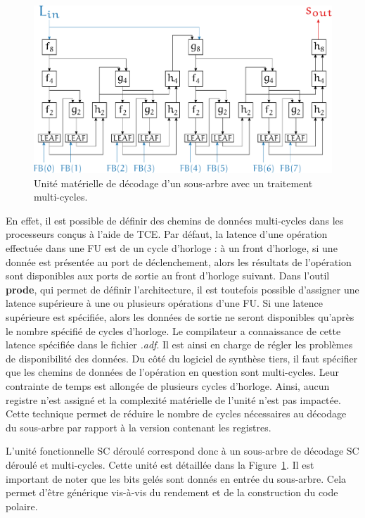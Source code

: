 \begin{figure}[htp]
	\centering
	\includegraphics[width=\textwidth]{main/ch4_fig/unrolled_multicycle}
	\caption{Unité matérielle de décodage d'un sous-arbre avec un traitement multi-cycles.}
	\label{fig:unrolled_multicycles}
\end{figure}

En effet, il est possible de définir des chemins de données multi-cycles dans les processeurs conçus à l'aide de TCE. Par défaut, la latence d'une opération effectuée dans une FU est de un cycle d'horloge : à un front d'horloge, si une donnée est présentée au port de déclenchement, alors les résultats de l'opération sont disponibles aux ports de sortie au front d'horloge suivant. Dans l'outil \textbf{prode}, qui permet de définir l'architecture, il est toutefois possible d'assigner une latence supérieure à une ou plusieurs opérations d'une FU. Si une latence supérieure est spécifiée, alors les données de sortie ne seront disponibles qu'après le nombre spécifié de cycles d'horloge. Le compilateur a connaissance de cette latence spécifiée dans le fichier \textit{.adf}. Il est ainsi en charge de régler les problèmes de disponibilité des données. Du côté du logiciel de synthèse tiers, il faut spécifier que les chemins de données de l'opération en question sont multi-cycles. Leur contrainte de temps est allongée de plusieurs cycles d'horloge. Ainsi, aucun registre n'est assigné et la complexité matérielle de l'unité n'est pas impactée. Cette technique permet de réduire le nombre de cycles nécessaires au décodage du sous-arbre par rapport à la version contenant les registres.

L'unité fonctionnelle \og SC déroulé \fg correspond donc à un sous-arbre de décodage SC déroulé et multi-cycles. Cette unité est détaillée dans la Figure~\ref{fig:unrolled_multicycles}. Il est important de noter que les bits gelés sont donnés en entrée du sous-arbre. Cela permet d'être générique vis-à-vis du rendement et de la construction du code polaire.

